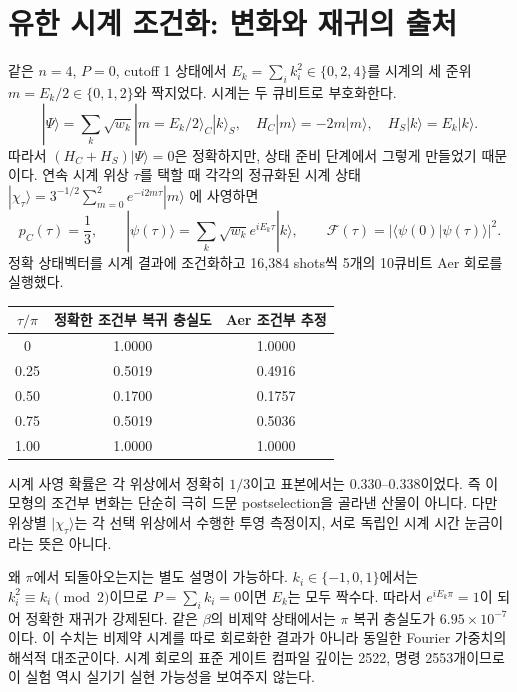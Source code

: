\documentclass[11pt,a4paper]{article}
\begin{document}
\section{유한 시계 조건화: 변화와 재귀의 출처}
같은 $n=4$, $P=0$, cutoff 1 상태에서
$E_k=\sum_i k_i^2\in\{0,2,4\}$를 시계의 세 준위
$m=E_k/2\in\{0,1,2\}$와 짝지었다. 시계는 두 큐비트로 부호화한다.
\begin{equation}
 |\Psi\rangle=\sum_k\sqrt{w_k}|m=E_k/2\rangle_C|k\rangle_S,
 \quad H_C|m\rangle=-2m|m\rangle,
 \quad H_S|k\rangle=E_k|k\rangle .
\end{equation}
따라서 $(H_C+H_S)|\Psi\rangle=0$은 정확하지만,
상태 준비 단계에서 그렇게 만들었기 때문이다. 연속 시계 위상
$\tau$를 택할 때 각각의 정규화된 시계 상태
$|\chi_\tau\rangle=3^{-1/2}\sum_{m=0}^{2}e^{-i2m\tau}|m\rangle$
에 사영하면
\begin{equation}
 p_C(\tau)=\frac13,
 \qquad
 |\psi(\tau)\rangle=\sum_k\sqrt{w_k}e^{iE_k\tau}|k\rangle,
 \qquad
 \mathcal F(\tau)=|\langle\psi(0)|\psi(\tau)\rangle|^2 .
\end{equation}
정확 상태벡터를 시계 결과에 조건화하고 16,384 shots씩 5개의
10큐비트 Aer 회로를 실행했다.
\begin{center}
\begin{tabular}{@{}ccc@{}}
\toprule
$\tau/\pi$ & 정확한 조건부 복귀 충실도 & Aer 조건부 추정 \\
\midrule
0 & 1.0000 & 1.0000 \\
0.25 & 0.5019 & 0.4916 \\
0.50 & 0.1700 & 0.1757 \\
0.75 & 0.5019 & 0.5036 \\
1.00 & 1.0000 & 1.0000 \\
\bottomrule
\end{tabular}
\end{center}
시계 사영 확률은 각 위상에서 정확히 $1/3$이고 표본에서는
$0.330$--$0.338$이었다. 즉 이 모형의 조건부 변화는 단순히
극히 드문 postselection을 골라낸 산물이 아니다. 다만 위상별
$|\chi_\tau\rangle$는 각 선택 위상에서 수행한 투영 측정이지,
서로 독립인 시계 시간 눈금이라는 뜻은 아니다.

왜 $\pi$에서 되돌아오는지는 별도 설명이 가능하다.
$k_i\in\{-1,0,1\}$에서는 $k_i^2\equiv k_i\pmod2$이므로
$P=\sum_i k_i=0$이면 $E_k$는 모두 짝수다.
따라서 $e^{iE_k\pi}=1$이 되어 정확한 재귀가 강제된다.
같은 $\beta$의 비제약 상태에서는 $\pi$ 복귀 충실도가
$6.95\times10^{-7}$이다. 이 수치는 비제약 시계를 따로
회로화한 결과가 아니라 동일한 Fourier 가중치의 해석적 대조군이다.
시계 회로의 표준 게이트 컴파일 깊이는 2522, 명령 2553개이므로
이 실험 역시 실기기 실현 가능성을 보여주지 않는다.
\end{document}
